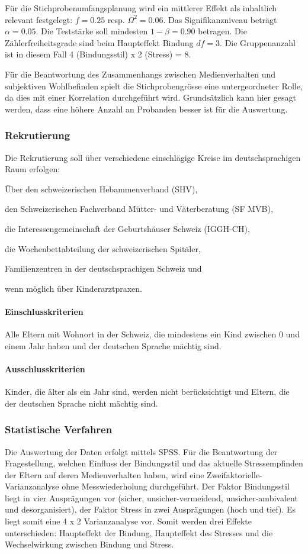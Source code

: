 Für die Stichprobenumfangsplanung wird ein mittlerer Effekt als inhaltlich relevant festgelegt: $f = 0.25$ resp. $\Omega^2 = 0.06$. Das Signifikanzniveau beträgt $\alpha=0.05$. Die Teststärke soll mindesten $1-\beta=0.90$ betragen. Die Zählerfreiheitsgrade sind beim Haupteffekt Bindung $df = 3$. Die Gruppenanzahl ist in diesem Fall 4 (Bindungsstil) x 2 (Stress) = 8.

Für die Beantwortung des Zusammenhangs zwischen Medienverhalten und subjektiven Wohlbefinden spielt die Stichprobengrösse eine untergeordneter Rolle, da dies mit einer Korrelation durchgeführt wird. Grundsätzlich kann hier gesagt werden, dass eine höhere Anzahl an Probanden besser ist für die Auswertung.

\subsubsection{Rekrutierung}
Die Rekrutierung soll über verschiedene einschlägige Kreise im deutschsprachigen Raum erfolgen: 
\begin{seriate}
    \item Über den schweizerischen Hebammenverband (SHV),
    \item den Schweizerischen Fachverband Mütter- und Väterberatung (SF MVB),
    \item die Interessengemeinschaft der Geburtshäuser Schweiz (IGGH-CH),
    \item die Wochenbettabteilung der schweizerischen Spitäler,
    \item Familienzentren in der deutschsprachigen Schweiz und
    \item wenn möglich über Kinderarztpraxen.
\end{seriate}
\paragraph{Einschlusskriterien}
Alle Eltern mit Wohnort in der Schweiz, die mindestens ein Kind zwischen 0 und einem Jahr haben und der deutschen Sprache mächtig sind.
\paragraph{Ausschlusskriterien}
Kinder, die älter als ein Jahr sind, werden nicht berücksichtigt und Eltern, die der deutschen Sprache nicht mächtig sind.
\subsubsection{Statistische Verfahren}
Die Auswertung der Daten erfolgt mittels SPSS. 
Für die Beantwortung der Fragestellung, welchen Einfluss der Bindungsstil und das aktuelle Stressempfinden der Eltern auf deren Medienverhalten haben, wird eine Zweifaktorielle-Varianzanalyse ohne Messwiederholung durchgeführt. Der Faktor Bindungsstil liegt in vier Ausprägungen vor (sicher, unsicher-vermeidend, unsicher-ambivalent und desorganisiert), der Faktor Stress in zwei Ausprägungen (hoch und tief). Es liegt somit eine 4 x 2 Varianzanalyse vor. Somit werden drei Effekte unterschieden: Haupteffekt der Bindung, Haupteffekt des Stresses und die Wechselwirkung zwischen Bindung und Stress. 

